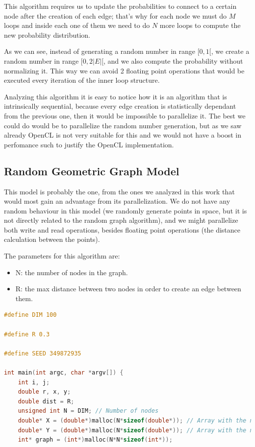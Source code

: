 \documentclass[titlepage]{article}
\begin{document}
This algorithm requires us to update the probabilities to connect to a certain node after the creation of each edge; that's why for each node we must do $M$ loops and inside each one of them we need to do $N$ more loops to compute the new probability distribution.

As we can see, instead of generating a random number in range $[0,1[$, we create a random number in range $[0,2|E|[$, and we also compute the probability without normalizing it. This way we can avoid 2 floating point operations that would be executed every iteration of the inner loop structure.

Analyzing this algorithm it is easy to notice how it is an algorithm that is intrinsically sequential, because every edge creation is statistically dependant from the previous one, then it would be impossible to parallelize it. The best we could do would be to parallelize the random number generation, but as we saw already OpenCL is not very suitable for this and we would not have a boost in perfomance such to justify the OpenCL implementation.

\subsection{Random Geometric Graph Model}
This model is probably the one, from the ones we analyzed in this work that would most gain an advantage from its parallelization. We do not have any random behaviour in this model (we randomly generate points in space, but it is not directly related to the random graph algorithm), and we might parallelize both write and read operations, besides floating point operations (the distance calculation between the points).

The parameters for this algorithm are: 

\begin{itemize}
    \item N: the number of nodes in the graph.
    \item R: the max distance between two nodes in order to create an edge between them.
\end{itemize}

\begin{minipage}{\linewidth}
\begin{lstlisting}[language=C, style=customc, breaklines=true]
#define DIM 100

#define R 0.3

#define SEED 349872935

int main(int argc, char *argv[]) {
    int i, j;
    double r, x, y;
    double dist = R;
    unsigned int N = DIM; // Number of nodes
    double* X = (double*)malloc(N*sizeof(double*)); // Array with the nodes abscissa
    double* Y = (double*)malloc(N*sizeof(double*)); // Array with the nodes ordinate
    int* graph = (int*)malloc(N*N*sizeof(int*));
\end{lstlisting}
\end{minipage}
\end{document}
